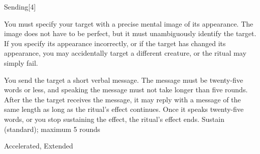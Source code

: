 \begin{spellsection}{Sending}[4]
\begin{spellcontent}
\begin{spelltargetinginfo}
\spellspecial
You must specify your target with a precise mental image of its appearance.
The image does not have to be perfect, but it must unambiguously identify the target.
If you specify its appearance incorrectly, or if the target has changed its appearance, you may accidentally target a different creature, or the ritual may simply fail.
\end{spelltargetinginfo}
\begin{spelleffects}
\spelleffect
You send the target a short verbal message.
The message must be twenty-five words or less, and speaking the message must not take longer than five rounds.
After the the target receives the message, it may reply with a message of the same length as long as the ritual's effect continues.
Once it speaks twenty-five words, or you stop sustaining the effect, the ritual's effect ends.
\spelldur Sustain (standard); maximum 5 rounds
\end{spelleffects}
\end{spellcontent}
\begin{spellfooter}
 Accelerated, Extended
\end{spellfooter}
\begin{spellsubcontent}
\end{spellsubcontent}
\end{spellsection}

